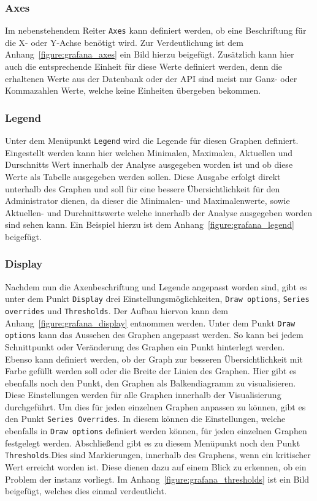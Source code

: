 {\subsubsection{Axes}
Im nebenstehendem Reiter \texttt{Axes} kann definiert werden, ob eine
Beschriftung für die X- oder Y\hyp{}Achse benötigt wird. Zur Verdeutlichung ist
dem Anhang~\ref{figure:grafana_axes} ein Bild hierzu beigefügt. Zusätzlich kann
hier auch die entsprechende Einheit für diese Werte definiert werden, denn die
erhaltenen Werte aus der Datenbank oder der API sind meist nur Ganz- oder
Kommazahlen Werte, welche keine Einheiten übergeben bekommen.
\mr%

\subsubsection{Legend}
Unter dem Menüpunkt \texttt{Legend} wird die Legende für diesen Graphen
definiert. Eingestellt werden kann hier welchen Minimalen, Maximalen, Aktuellen
und Durschnitts Wert innerhalb der Analyse ausgegeben worden ist und ob diese
Werte als Tabelle ausgegeben werden sollen. Diese Ausgabe erfolgt direkt
unterhalb des Graphen und soll für eine bessere Übersichtlichkeit für den
Administrator dienen, da dieser die Minimalen- und Maximalenwerte, sowie
Aktuellen- und Durchnittswerte welche innerhalb der Analyse ausgegeben worden
sind sehen kann. Ein Beispiel hierzu ist dem Anhang~\ref{figure:grafana_legend}
beigefügt.
\mr%

\subsubsection{Display}
Nachdem nun die Axenbeschriftung und Legende angepasst worden sind, gibt es
unter dem Punkt \texttt{Display} drei Einstellungsmöglichkeiten, \texttt{Draw
options}, \texttt{Series overrides} und \texttt{Thresholds}. Der Aufbau hiervon
kann dem Anhang~\ref{figure:grafana_display} entnommen werden. Unter dem Punkt
\texttt{Draw options} kann das Aussehen des Graphen angepasst werden.  So kann
bei jedem Schnittpunkt oder Veränderung des Graphen ein Punkt hinterlegt
werden. Ebenso kann definiert werden, ob der Graph zur besseren
Übersichtlichkeit mit Farbe gefüllt werden soll oder die Breite der Linien des
Graphen. Hier gibt es ebenfalls noch den Punkt, den Graphen als Balkendiagramm
zu visualisieren. Diese Einstellungen werden für alle Graphen innerhalb der
Visualisierung durchgeführt. Um dies für jeden einzelnen Graphen anpassen zu
können, gibt es den Punkt \texttt{Series Overrides}. In diesem können die
Einstellungen, welche ebenfalls in \texttt{Draw options} definiert werden
können, für jeden einzelnen Graphen festgelegt werden. Abschließend gibt es zu
diesem Menüpunkt noch den Punkt \texttt{Thresholds}.Dies sind Markierungen,
innerhalb des Graphens, wenn ein kritischer Wert erreicht worden ist. Diese
dienen dazu auf einem Blick zu erkennen, ob ein Problem der instanz vorliegt.
Im Anhang~\ref{figure:grafana_thresholds} ist ein Bild beigefügt, welches dies
einmal verdeutlicht.
\mr%

}
